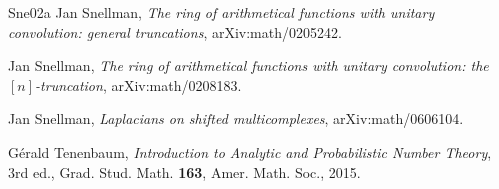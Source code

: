 \documentclass[a4paper,11pt,oneside,reqno]{amsart}
\theoremstyle{definition}
\theoremstyle{remark}
\theoremstyle{plain}
\begin{document}
\begin{thebibliography}{Sne02a}
Jan Snellman,
\emph{The ring of arithmetical functions with unitary convolution: general
truncations},
arXiv:math/0205242.

Jan Snellman,
\emph{The ring of arithmetical functions with unitary convolution: the
\([n]\)-truncation},
arXiv:math/0208183.

Jan Snellman,
\emph{Laplacians on shifted multicomplexes},
arXiv:math/0606104.

Gérald Tenenbaum,
\emph{Introduction to Analytic and Probabilistic Number Theory},
3rd ed., Grad. Stud. Math. \textbf{163}, Amer. Math. Soc., 2015.

\end{thebibliography}
\end{document}
